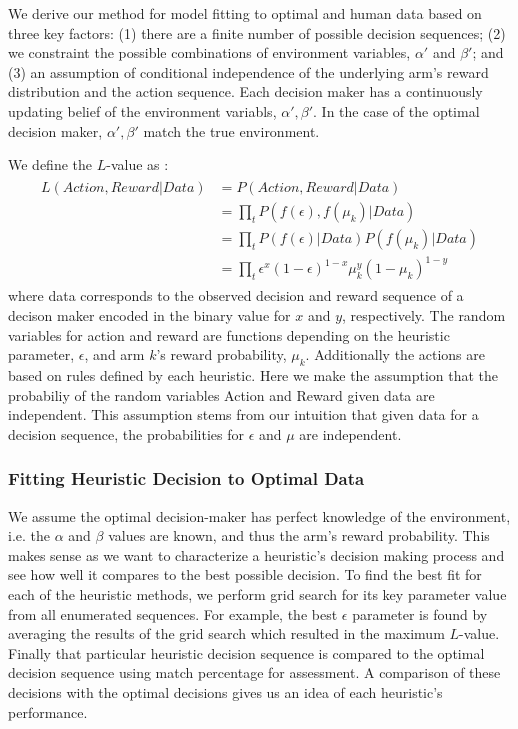 We derive our method for model fitting to optimal and human data based on three key factors: (1) there are a finite number of possible decision sequences; (2) we constraint the possible combinations of environment variables, $\alpha'$ and $\beta'$; and (3) an assumption of conditional independence of the underlying arm's reward distribution and the action sequence. Each decision maker has a continuously updating belief of the environment variabls, $\alpha',\beta'$. In the case of the optimal decision maker, $\alpha',\beta'$ match the true environment.

We define the $L$-value as :
\begin{align}
\begin{split}
	\label{eq:likelihood} 
	L(Action,Reward|Data) &= P(Action,Reward|Data) \\
						  &= \prod_{t} P(f(\epsilon),f(\mu_k)|Data) \\
						  &= \prod_{t} P(f(\epsilon)|Data) P(f(\mu_k)|Data) \\	
						  &= \prod_{t} \epsilon^x (1-\epsilon)^{1-x} \mu_k^y (1-\mu_k)^{1-y}
\end{split}
\end{align}
where data corresponds to the observed decision and reward sequence of a decison maker encoded in the binary value for $x$ and $y$, respectively. The random variables for action and reward are functions depending on the heuristic parameter, $\epsilon$, and arm $k$'s reward probability, $\mu_k$. Additionally the actions are based on rules defined by each heuristic. Here we make the assumption that the probabiliy of the random variables Action and Reward given data are independent. This assumption stems from our intuition that given data for a decision sequence, the probabilities for $\epsilon$ and $\mu$ are independent. 

\subsubsection{Fitting Heuristic Decision to Optimal Data}
We assume the optimal decision-maker has perfect knowledge of the environment, i.e. the $\alpha$ and $\beta$ values are known, and thus the arm's reward probability. This makes sense as we want to characterize a heuristic's decision making process and see how well it compares to the best possible decision. To find the best fit for each of the heuristic methods, we perform grid search for its key parameter value from all enumerated sequences. For example, the best $\epsilon$ parameter is found by averaging the results of the grid search which resulted in the maximum $L$-value. Finally that particular heuristic decision sequence is compared to the optimal decision sequence using match percentage for assessment. A comparison of these decisions with the optimal decisions gives us an idea of each heuristic's performance.

